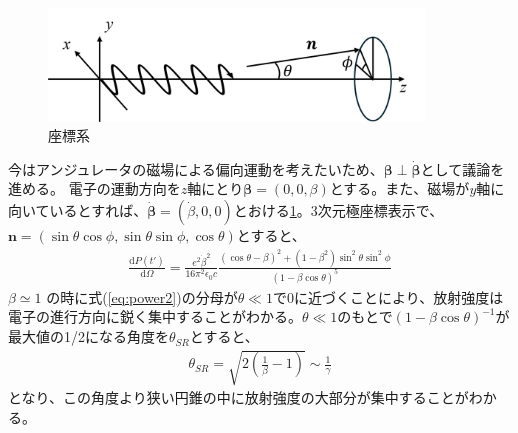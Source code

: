 \documentclass[a4paper,11pt,uplatex]{jsbook}
\begin{document}
\begin{figure}[h]
  \centering
  \includegraphics[width=10cm]{image/2-cordinate.png}
  \caption{座標系}\label{cordinate}
\end{figure}
今はアンジュレータの磁場による偏向運動を考えたいため、$\bm{\beta} \perp \bm{\dot{\beta}}$として議論を進める。
電子の運動方向を$z$軸にとり$\bm{\beta} = (0,0,\beta)$とする。また、磁場が$y$軸に向いているとすれば、$\bm{\dot{\beta}} = (\dot{\beta},0,0)$とおける\ref{cordinate}。3次元極座標表示で、$\bm{n} = (\sin\theta\cos\phi,\sin\theta\sin\phi,\cos\theta)$とすると、
\begin{eqnarray}\label{eq:power2}
  \frac{\text{d}P(t')}{\text{d}\Omega} = \frac{e^2\dot{\beta}^2}{16\pi^2 \epsilon_0 c}\frac{(\cos\theta - \beta)^2 + (1-\beta^2)\sin^2\theta\sin^2\phi}{(1-\beta \cos\theta)^5}
\end{eqnarray}
$\beta \simeq 1$ の時に式(\ref{eq:power2})の分母が$\theta \ll 1$で0に近づくことにより、放射強度は電子の進行方向に鋭く集中することがわかる。$\theta \ll 1$のもとで$(1-\beta\cos\theta)^{-1}$が最大値の1/2になる角度を$\theta_{SR}$とすると、
\begin{eqnarray}
  \theta_{SR} = \sqrt{2\left(\frac{1}{\beta} -1\right)} \sim \frac{1}{\gamma}
\end{eqnarray}
となり、この角度より狭い円錐の中に放射強度の大部分が集中することがわかる。
\end{document}
